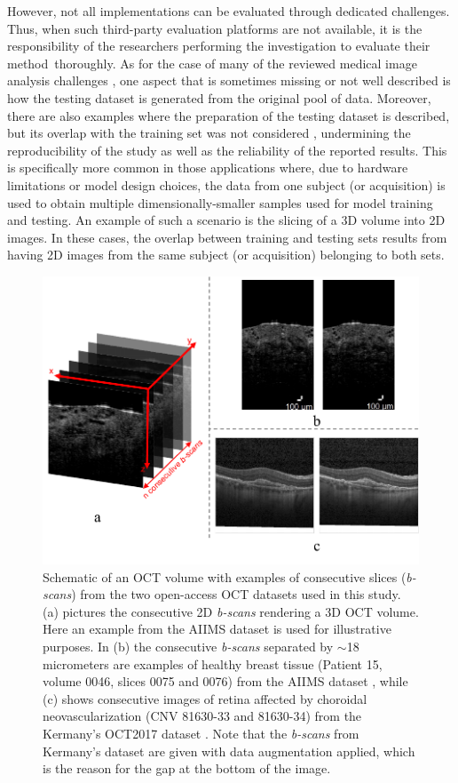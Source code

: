 \documentclass[fleqn,10pt]{wlscirep}
\begin{document}
However, not all implementations can be evaluated through dedicated challenges. Thus, when such third-party evaluation platforms are not available, it is the responsibility of the researchers performing the investigation to evaluate their \mbox{method thoroughly}. As for the case of many of the reviewed medical image analysis challenges \cite{maier2018rankings}, one aspect that is sometimes missing or not well described is how the testing dataset is generated from the original pool of data. Moreover, there are also examples where the preparation of the testing dataset is described, but its overlap with the training set was not considered \cite{wang2019deep, butola2020deep, irmak2021multi, sadad2021brain, yagis2021effect}, undermining the reproducibility of the study as well as the reliability of the reported results. This is specifically more common in those applications where, due to hardware limitations or model design choices, the data from one subject (or acquisition) is used to obtain multiple dimensionally-smaller samples used for model training and testing. An example of such a scenario is the slicing of a 3D volume into 2D images. In these cases, the overlap between training and testing sets results from having 2D images from the same subject (or acquisition) belonging to both sets.
\begin{figure}[t]
\centering
\includegraphics[width=450pt]{dataset_paper_OCT_volume_description.pdf}
\caption{Schematic of an OCT volume with examples of consecutive slices (\textit{b-scans}) from the two open-access OCT datasets used in this study. (a) pictures the consecutive 2D \textit{b-scans} rendering a 3D OCT volume. Here an example from the AIIMS dataset \cite{butola2019volumetric} is used for illustrative purposes. In (b) the consecutive \textit{b-scans} separated by $\sim$18 micrometers are examples of healthy breast tissue (Patient 15, volume 0046, slices 0075 and 0076) from the AIIMS dataset \cite{butola2019volumetric}, while (c) shows consecutive images of retina affected by choroidal neovascularization (CNV 81630-33 and 81630-34) from the Kermany’s OCT2017 dataset \cite{kermany2018large}. Note that the \textit{b-scans} from Kermany’s dataset are given with data augmentation applied, which is the reason for the gap at the bottom of the image.}
\label{fig:introduction_1}
\end{figure}
\end{document}
